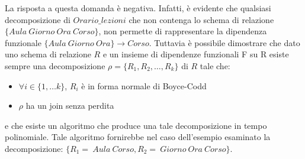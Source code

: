 La risposta a questa domanda è negativa. Infatti, è evidente che qualsiasi decomposizione di $Orario\_lezioni$ che non 
contenga lo schema di relazione $\{Aula\ Giorno\ Ora\ Corso\}$, non permette di rappresentare la dipendenza funzionale
$\{Aula\ Giorno\ Ora\} \rightarrow Corso$. Tuttavia è possibile dimostrare che dato uno schema di relazione $R$ e un 
insieme di dipendenze funzionali F su R esiste sempre una decomposizione $\rho=\{R_1, R_2, \ldots, R_k\}$ di $R$ tale 
che:
\begin{itemize}
 \item $\forall i \in \{1, \ldots k\}$, $R_i$ è in forma normale di Boyce-Codd
 \item $\rho$ ha un join senza perdita
\end{itemize}
e che esiste un algoritmo che produce una tale decomposizione in tempo polinomiale. Tale algoritmo fornirebbe nel caso 
dell'esempio esaminato la decomposizione: $\{R_1 =\ Aula\ Corso, R_2 =\ Giorno\ Ora\ Corso\}$.